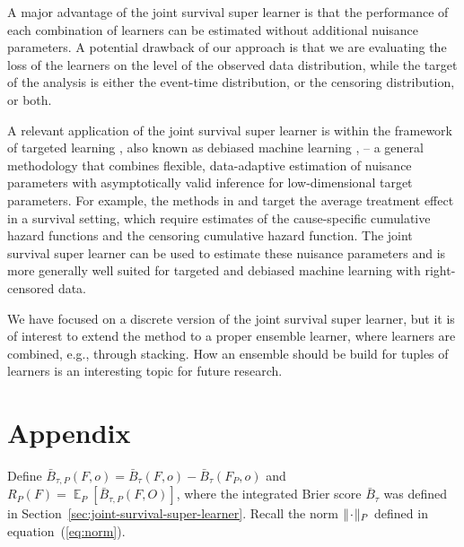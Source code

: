 \documentclass[alpha-refs]{wiley-article}
\DeclareMathOperator{\E}{\mathbb{E}} %
\newcommand{\blank}{\makebox[1ex]{\textbf{$\cdot$}}}
\newcommand{\1}{\mathds{1}}
\begin{document}
A major advantage of the joint survival super learner is that the
performance of each combination of learners can be estimated without
additional nuisance parameters. A potential drawback of our approach
is that we are evaluating the loss of the learners on the level of the
observed data distribution, while the target of the analysis is either
the event-time distribution, or the censoring distribution, or both.

A relevant application of the joint survival super learner is within
the framework of targeted learning \citep{van2011targeted}, also known
as debiased machine learning \citep{chernozhukov2018double}, -- a
general methodology that combines flexible, data-adaptive estimation
of nuisance parameters with asymptotically valid inference for
low-dimensional target parameters.  For example, the methods in
\cite{van2003unified} and \cite{rytgaard2022targeted} target the
average treatment effect in a survival setting, which require
estimates of the cause-specific cumulative hazard functions and the
censoring cumulative hazard function. The joint survival super learner
can be used to estimate these nuisance parameters and is more
generally well suited for targeted and debiased machine learning with
right-censored data.

We have focused on a discrete version of the joint survival super
learner, but it is of interest to extend the method to a proper
ensemble learner, where learners are combined, e.g., through
stacking. How an ensemble should be build for tuples of learners is an
interesting topic for future research.

\appendix

\section*{Appendix}


Define
\( \bar{B}_{\tau,P}(F, o) = \bar{B}_{\tau}(F, o) -
\bar{B}_{\tau}(F_P, o) \) and
\( R_{P}(F) = \E_P{[\bar{B}_{\tau,P}(F, O)]} \), where the
integrated Brier score \( \bar{B}_{\tau} \) was defined in
Section~\ref{sec:joint-survival-super-learner}. Recall the norm
\( \Vert \blank \Vert_{P}\) defined in
equation~(\ref{eq:norm}).
\end{document}
